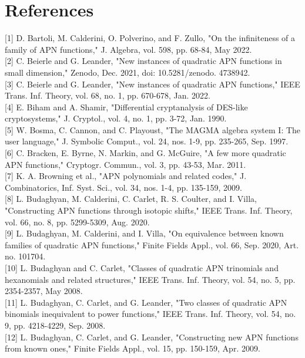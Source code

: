 \documentclass[10pt]{article}
\begin{document}
\section*{References}
[1] D. Bartoli, M. Calderini, O. Polverino, and F. Zullo, "On the infiniteness of a family of APN functions," J. Algebra, vol. 598, pp. 68-84, May 2022.\\[0pt]
[2] C. Beierle and G. Leander, "New instances of quadratic APN functions in small dimension," Zenodo, Dec. 2021, doi: 10.5281/zenodo. 4738942.\\[0pt]
[3] C. Beierle and G. Leander, "New instances of quadratic APN functions," IEEE Trans. Inf. Theory, vol. 68, no. 1, pp. 670-678, Jan. 2022.\\[0pt]
[4] E. Biham and A. Shamir, "Differential cryptanalysis of DES-like cryptosystems," J. Cryptol., vol. 4, no. 1, pp. 3-72, Jan. 1990.\\[0pt]
[5] W. Bosma, C. Cannon, and C. Playoust, "The MAGMA algebra system I: The user language," J. Symbolic Comput., vol. 24, nos. 1-9, pp. 235-265, Sep. 1997.\\[0pt]
[6] C. Bracken, E. Byrne, N. Markin, and G. McGuire, "A few more quadratic APN functions," Cryptogr. Commun., vol. 3, pp. 43-53, Mar. 2011.\\[0pt]
[7] K. A. Browning et al., "APN polynomials and related codes," J. Combinatorics, Inf. Syst. Sci., vol. 34, nos. 1-4, pp. 135-159, 2009.\\[0pt]
[8] L. Budaghyan, M. Calderini, C. Carlet, R. S. Coulter, and I. Villa, "Constructing APN functions through isotopic shifts," IEEE Trans. Inf. Theory, vol. 66, no. 8, pp. 5299-5309, Aug. 2020.\\[0pt]
[9] L. Budaghyan, M. Calderini, and I. Villa, "On equivalence between known families of quadratic APN functions," Finite Fields Appl., vol. 66, Sep. 2020, Art. no. 101704.\\[0pt]
[10] L. Budaghyan and C. Carlet, "Classes of quadratic APN trinomials and hexanomials and related structures," IEEE Trans. Inf. Theory, vol. 54, no. 5, pp. 2354-2357, May 2008.\\[0pt]
[11] L. Budaghyan, C. Carlet, and G. Leander, "Two classes of quadratic APN binomials inequivalent to power functions," IEEE Trans. Inf. Theory, vol. 54, no. 9, pp. 4218-4229, Sep. 2008.\\[0pt]
[12] L. Budaghyan, C. Carlet, and G. Leander, "Constructing new APN functions from known ones," Finite Fields Appl., vol. 15, pp. 150-159, Apr. 2009.\\[0pt]
\end{document}
